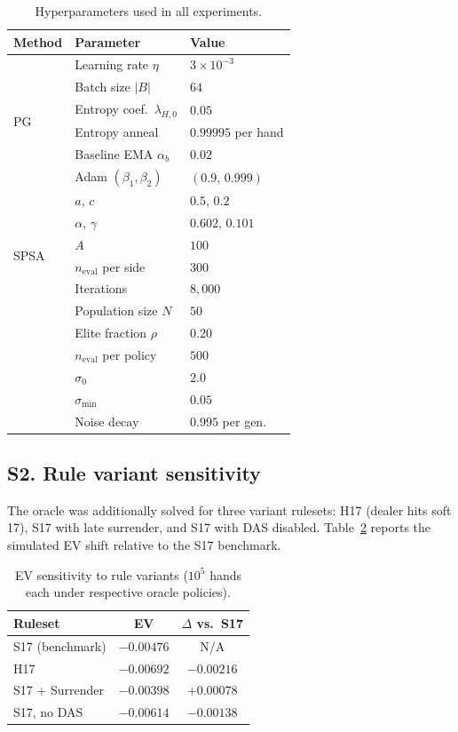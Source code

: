 \documentclass[12pt]{article}
\begin{document}
\begin{table}[h]
\centering
\caption{Hyperparameters used in all experiments.}
\label{tab:hparams}
\small
\begin{tabular}{lll}
\toprule
Method & Parameter & Value \\
\midrule
\multirow{6}{*}{PG}
  & Learning rate $\eta$ & $3 \times 10^{-3}$ \\
  & Batch size $|B|$ & $64$ \\
  & Entropy coef.\ $\lambda_{H,0}$ & $0.05$ \\
  & Entropy anneal & $0.99995$ per hand \\
  & Baseline EMA $\alpha_b$ & $0.02$ \\
  & Adam $(\beta_1, \beta_2)$ & $(0.9,\,0.999)$ \\
\midrule
\multirow{6}{*}{SPSA}
  & $a$, $c$ & $0.5$, $0.2$ \\
  & $\alpha$, $\gamma$ & $0.602$, $0.101$ \\
  & $A$ & $100$ \\
  & $n_\mathrm{eval}$ per side & $300$ \\
  & Iterations & $8{,}000$ \\
\midrule
\multirow{6}{*}{CEM}
  & Population size $N$ & $50$ \\
  & Elite fraction $\rho$ & $0.20$ \\
  & $n_\mathrm{eval}$ per policy & $500$ \\
  & $\sigma_0$ & $2.0$ \\
  & $\sigma_\mathrm{min}$ & $0.05$ \\
  & Noise decay & $0.995$ per gen.\ \\
\bottomrule
\end{tabular}
\end{table}

\subsection*{S2. Rule variant sensitivity}

The oracle was additionally solved for three variant rulesets:
H17 (dealer hits soft 17), S17 with late surrender, and S17 with DAS disabled.
Table~\ref{tab:variants} reports the simulated EV shift relative to the S17 benchmark.

\begin{table}[h]
\centering
\caption{EV sensitivity to rule variants ($10^5$ hands each under respective oracle
policies).}
\label{tab:variants}
\small
\begin{tabular}{lcc}
\toprule
Ruleset & EV & $\Delta$ vs.\ S17 \\
\midrule
S17 (benchmark) & $-0.00476$ & N/A \\
H17             & $-0.00692$ & $-0.00216$ \\
S17 + Surrender & $-0.00398$ & $+0.00078$ \\
S17, no DAS     & $-0.00614$ & $-0.00138$ \\
\bottomrule
\end{tabular}
\end{table}
\end{document}
